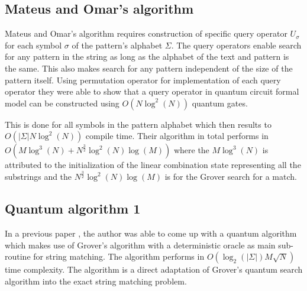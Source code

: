 \subsection{Mateus and Omar's algorithm}
Mateus and Omar's algorithm requires construction of specific query operator $U_\sigma$ for each symbol $\sigma$ of the pattern's alphabet $\Sigma$. The query operators enable search for any pattern in the string as long as the alphabet of the text and pattern is the same. This also makes search for any pattern independent of the size of the pattern itself. Using permutation operator for implementation of each query operator they were able to show that a query operator in quantum circuit formal model can be constructed using $O(N\log^2(N))$ quantum gates.

This is done for all symbols in the pattern alphabet which then results to $O(\vert \Sigma \vert N\log^2(N))$ compile time. Their algorithm in total performs in $O(M\log^3(N) + N^{\frac{3}{2}}\log^2(N) \log(M))$ where the $M\log^3(N)$ is attributed to the initialization of the linear combination state representing all the substrings and the $N^{\frac{3}{2}}\log^2(N)\log(M)$ is for the Grover search for a match.

\subsection{Quantum algorithm 1}
In a previous paper \cite{Aborot2013}, the author was able to come up with a quantum algorithm which makes use of Grover's algorithm with a deterministic oracle as main sub-routine for string matching. The algorithm performs in $O(\log_2(\vert \Sigma \vert)M\sqrt{N})$ time complexity. The algorithm is a direct adaptation of Grover's quantum search algorithm into the exact string matching problem. 

